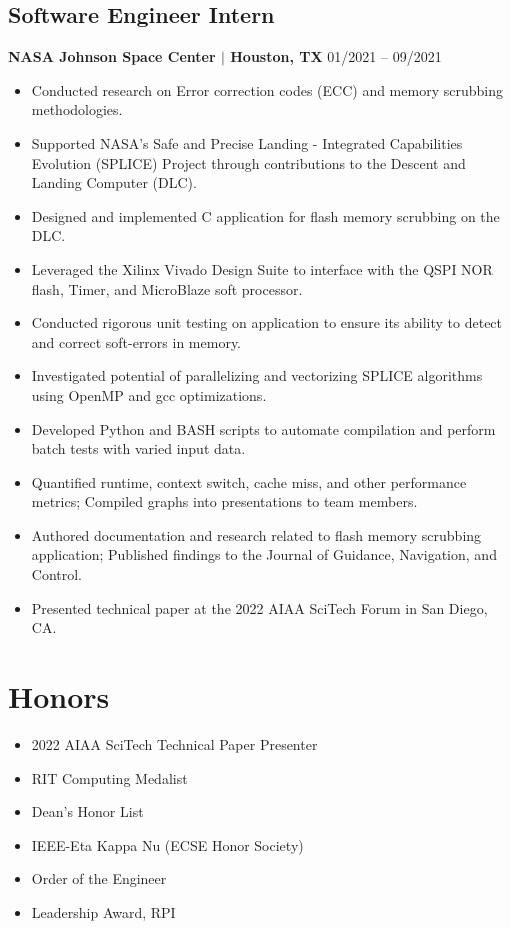 \documentclass{article}
\begin{document}
\subsection{Software Engineer Intern}{\bf NASA Johnson Space Center $\mid$ Houston, TX} \hfill {01/2021 -- 09/2021}\\
\vspace{-.2in}
\begin{itemize}
    \itemsep-.2em
    \item Conducted research on Error correction codes (ECC) and memory scrubbing methodologies.
    \item Supported NASA's Safe and Precise Landing - Integrated Capabilities Evolution (SPLICE) Project through contributions to the Descent and Landing Computer (DLC).
    \item Designed and implemented C application for flash memory scrubbing on the DLC.
    \item Leveraged the Xilinx Vivado Design Suite to interface with the QSPI NOR flash, Timer, and MicroBlaze soft processor.
    \item Conducted rigorous unit testing on application to ensure its ability to detect and correct soft-errors in memory. 
    \item Investigated potential of parallelizing and vectorizing SPLICE algorithms using OpenMP and gcc optimizations.
    \item Developed Python and BASH scripts to automate compilation and perform batch tests with varied input data.
    \item Quantified runtime, context switch, cache miss, and other performance metrics; Compiled graphs into presentations to team members.
    \item Authored documentation and research related to flash memory scrubbing application; Published findings to the Journal of Guidance, Navigation, and Control.
    \item Presented technical paper at the 2022 AIAA SciTech Forum in San Diego, CA.
\end{itemize}

\section{Honors}
\vspace{-.2in}
\begin{multicols}{2}
    \begin{itemize}
    \itemsep-.2em
        \item 2022 AIAA SciTech Technical Paper Presenter
        \item RIT Computing Medalist
        \item Dean's Honor List
        \item IEEE-Eta Kappa Nu (ECSE Honor Society)
        \item Order of the Engineer
        \item Leadership Award, RPI
    \end{itemize}
\end{multicols}
\end{document}
